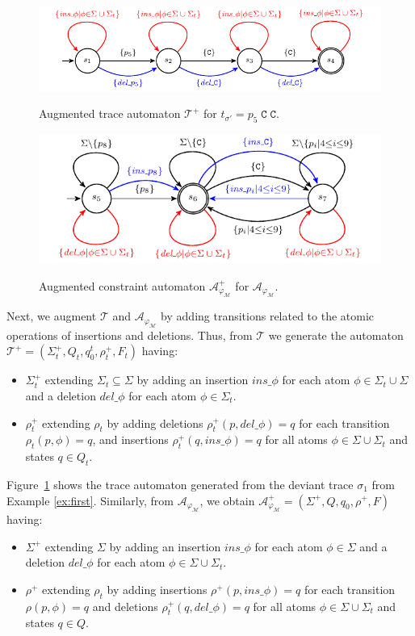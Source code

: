 \begin{figure}[!t]
	\centering
	{\includegraphics[width=.65\textwidth]{images/Tplus}}
	\caption{Augmented trace automaton $\mathcal{T}^+$ for $t_{\sigma'}=p_5\;\texttt{C}\;\texttt{C}$.}\label{fig:tplus}
\end{figure} \begin{figure}[!t]
\centering
{\includegraphics[width=.65\textwidth]{images/Aplus}}
\caption{Augmented constraint automaton $\mathcal{A}_{\varphi_{\mathcal{M}}}^+$ for $\mathcal{A}_{\varphi_{\mathcal{M}}}$.}\label{fig:aplus}
\end{figure}
Next, we augment $\mathcal{T}$ and $\mathcal{A}_{\varphi_{\mathcal{M}}}$ by adding transitions related to the atomic operations of insertions and deletions. Thus, from $\mathcal{T}$ we generate the automaton $\mathcal{T}^+=(\Sigma_t^+,Q_t,q_0^t,\rho_t^+,F_t)$ having:
\begin{itemize}
	\item $\Sigma_t^+$ extending $\Sigma_t\subseteq \Sigma$ by adding an insertion $\textit{ins\_}\phi$ for each atom $\phi\in\Sigma_t\cup\Sigma$ and a deletion $\textit{del\_}\phi$ for each atom  $\phi\in\Sigma_t$.
	\item $\rho_t^+$ extending $\rho_t$ by adding deletions $\rho_t^+(p,\textit{del\_}\phi)=q$ for each transition $\rho_t(p,\phi)=q$, and insertions $\rho_t^+(q,\textit{ins\_}\phi)=q$ for all atoms $\phi\in\Sigma\cup\Sigma_t$ and states $q\in Q_t$.
\end{itemize}
Figure~\ref{fig:tplus} shows the trace automaton generated from the deviant trace $\sigma_1$ from Example \ref{ex:first}. Similarly, from $\mathcal{A}_{\varphi_{\mathcal{M}}}$, we obtain $\mathcal{A}_{\varphi_{\mathcal{M}}}^+=(\Sigma^+,Q,q_0,\rho^+,F)$ having:
\begin{itemize}
	\item $\Sigma^+$ extending $\Sigma$ by adding an insertion $\textit{ins\_}\phi$ for each atom $\phi\in\Sigma$ and a deletion $\textit{del\_}\phi$ for each atom  $\phi\in\Sigma\cup\Sigma_t$.
\item $\rho^+$ extending $\rho_t$ by adding insertions $\rho^+(p,\textit{ins\_}\phi)=q$ for each transition $\rho(p,\phi)=q$ and deletions $\rho_t^+(q,\textit{del\_}\phi)=q$ for all atoms $\phi\in\Sigma\cup\Sigma_t$ and states $q\in Q$.
\end{itemize}
